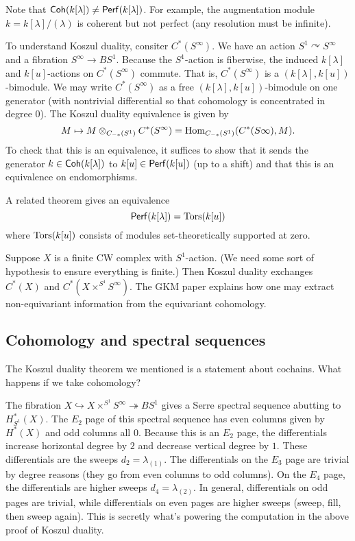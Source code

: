 \documentclass{article}
\begin{document}
\begin{rmk}
  Note that $\mathsf{Coh}(k[\lambda]) \neq \mathsf{Perf}(k[\lambda])$.
  For example, the augmentation module $k = k[\lambda] / (\lambda)$ is coherent but not perfect (any resolution must be infinite).
\end{rmk}

To understand Koszul duality, consiter $C^*(S^\infty)$.
We have an action $S^1 \curvearrowright S^\infty$ and a fibration $S^\infty \to BS^1$.
Because the $S^1$-action is fiberwise, the induced $k[\lambda]$ and $k[u]$-actions on $C^*(S^\infty)$ commute.
That is, $C^*(S^\infty)$ is a $(k[\lambda], k[u])$-bimodule.
We may write $C^*(S^\infty)$ as a free $(k[\lambda], k[u])$-bimodule on one generator (with nontrivial differential so that cohomology is concentrated in degree $0$).
The Koszul duality equivalence is given by
\[
  M \mapsto M \otimes_{C_{-*}(S^1)} C^*(S^\infty) = \operatorname{Hom}_{C_{-*}(S^1)}(C^*(S\infty), M).
\]
To check that this is an equivalence, it suffices to show that it sends the generator $k \in \mathsf{Coh}(k[\lambda])$ to $k[u] \in \mathsf{Perf}(k[u])$ (up to a shift) and that this is an equivalence on endomorphisms.

A related theorem gives an equivalence
\[
  \mathsf{Perf}(k[\lambda]) = \operatorname{Tors}(k[u])
\]
where $\operatorname{Tors}(k[u])$ consists of modules set-theoretically supported at zero.

Suppose $X$ is a finite CW complex with $S^1$-action.
(We need some sort of hypothesis to ensure everything is finite.)
Then Koszul duality exchanges $C^*(X)$ and $C^*(X \times^{S^1} S^\infty)$.
The GKM paper explains how one may extract non-equivariant information from the equivariant cohomology.

\subsection{Cohomology and spectral sequences}

The Koszul duality theorem we mentioned is a statement about cochains.
What happens if we take cohomology?

The fibration $X \hookrightarrow X \times^{S^1} S^\infty \twoheadrightarrow BS^1$ gives a Serre spectral sequence abutting to $H^*_{S^1}(X)$.
The $E_2$ page of this spectral sequence has even columns given by $H^*(X)$ and odd columns all $0$.
Because this is an $E_2$ page, the differentials increase horizontal degree by $2$ and decrease vertical degree by $1$.
These differentials are the sweeps $d_2 = \lambda_{(1)}$.
The differentials on the $E_3$ page are trivial by degree reasons (they go from even columns to odd columns).
On the $E_4$ page, the differentials are higher sweeps $d_4 = \lambda_{(2)}$.
In general, differentials on odd pages are trivial, while differentials on even pages are higher sweeps (sweep, fill, then sweep again).
This is secretly what's powering the computation in the above proof of Koszul duality.
\end{document}
